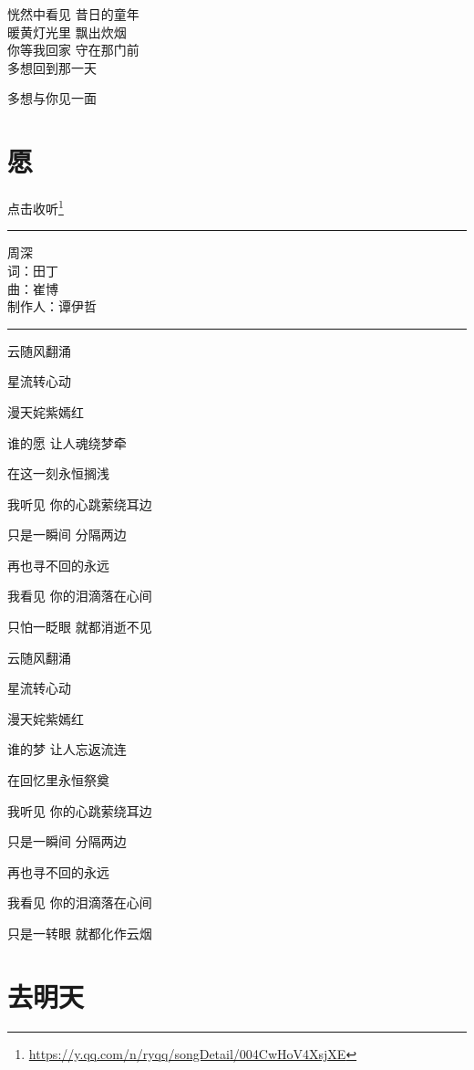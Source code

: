 \documentclass[]{ctexbook}
\renewcommand{\href}[2]{#2\footnote{\url{#1}}}
\begin{document}
恍然中看见 昔日的童年\\
暖黄灯光里 飘出炊烟\\
你等我回家 守在那门前\\
多想回到那一天

多想与你见一面

\section*{愿}\label{wish}


\href{https://y.qq.com/n/ryqq/songDetail/004CwHoV4XsjXE}{点击收听}

\begin{center}\rule{0.5\linewidth}{0.5pt}\end{center}

周深\\
词：田丁\\
曲：崔博\\
制作人：谭伊哲

\begin{center}\rule{0.5\linewidth}{0.5pt}\end{center}

云随风翻涌

星流转心动

漫天姹紫嫣红

谁的愿 让人魂绕梦牵

在这一刻永恒搁浅

我听见 你的心跳萦绕耳边

只是一瞬间 分隔两边

再也寻不回的永远

我看见 你的泪滴落在心间

只怕一眨眼 就都消逝不见

云随风翻涌

星流转心动

漫天姹紫嫣红

谁的梦 让人忘返流连

在回忆里永恒祭奠

我听见 你的心跳萦绕耳边

只是一瞬间 分隔两边

再也寻不回的永远

我看见 你的泪滴落在心间

只是一转眼 就都化作云烟

\section*{去明天}\label{go-tomorrow}
\end{document}
